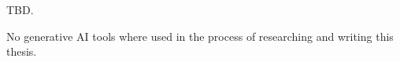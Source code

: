 \documentclass[draft,final]{vutinfth} %
\begin{document}
TBD.




\backmatter

\begin{aitools}
    No generative AI tools where used in the process of researching and writing this thesis.
\end{aitools}

\listoffigures %

\cleardoublepage %
\listoftables %

\listofalgorithms
{}

\printindex

\printglossaries



\end{document}
